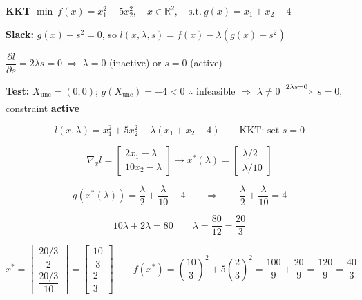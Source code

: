 \documentclass[10pt,a3paper]{article}
\begin{document}
\begin{minipage}[t]{0.50\linewidth}

\noindent\textbf{KKT} \quad $\min\ f(x) = x_1^2 + 5x_2^2,\quad x \in \mathbb{R}^2,\quad \text{s.t.}\ g(x) = x_1 + x_2 - 4$

\noindent\textbf{Slack:} $g(x) - s^2 = 0$, so $l(x,\lambda,s) = f(x) - \lambda(g(x) - s^2)$

\noindent$\dfrac{\partial l}{\partial s} = 2\lambda s = 0 \;\Rightarrow\; \lambda = 0$ (inactive) or $s = 0$ (active)

\noindent\textbf{Test:} $X_\text{unc} = (0,0)$;\; $g(X_\text{unc}) = -4 < 0$ \quad $\therefore$ infeasible $\Rightarrow$ $\lambda \neq 0$ \quad $\xRightarrow{2\lambda s=0}$ \quad $s = 0$, constraint \textbf{active}

\[
  l(x,\lambda) = x_1^2 + 5x_2^2 - \lambda(x_1 + x_2 - 4) \qquad \text{KKT: set } s=0
\]

\[
  \nabla_x l = \begin{bmatrix} 2x_1 - \lambda \\ 10x_2 - \lambda \end{bmatrix}
  \rightarrow
  x^*(\lambda) = \begin{bmatrix} \lambda/2 \\ \lambda/10 \end{bmatrix}
\]

\[
  g\!\left(x^*(\lambda)\right) = \frac{\lambda}{2} + \frac{\lambda}{10} - 4
  \qquad\Rightarrow\qquad
  \frac{\lambda}{2} + \frac{\lambda}{10} = 4
\]

\[
  10\lambda + 2\lambda = 80 \qquad \lambda = \frac{80}{12} = \frac{20}{3}
\]

\[
  x^* = \begin{bmatrix} \dfrac{20/3}{2} \\[4pt] \dfrac{20/3}{10} \end{bmatrix}
       = \begin{bmatrix} \dfrac{10}{3} \\[4pt] \dfrac{2}{3} \end{bmatrix}
  \qquad
  f(x^*) = \left(\frac{10}{3}\right)^2 + 5\left(\frac{2}{3}\right)^2
          = \frac{100}{9} + \frac{20}{9}
          = \frac{120}{9}
          = \frac{40}{3}
\]

\end{minipage}\hfill
\end{document}
